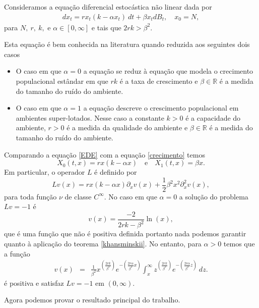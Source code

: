 \documentclass[12pt]{article}
\newcommand{\mr }{ \mathbb{R}}
\begin{document}
Consideramos a equação diferencial estocástica não linear dada por 
\begin{eqnarray}\label{crecimento}
dx_t=rx_t(k-\alpha x_t)~dt+\beta x_tdB_t, \quad x_0=N,
\end{eqnarray}
para $N,~r,~k,$ e $\alpha\in[0,\infty]$ e tais que $2rk>\beta^2$.

Esta equação é bem conhecida na literatura quando reduzida aos seguintes dois casos
\begin{itemize}
\item O caso em que $\alpha=0$ a equação se reduz à equação que modela o crecimento populacional estândar em que $rk$ é a taxa de crescimento e $\beta\in\mr$ é a medida do tamanho do ruído do ambiente.

\item O caso em que $\alpha=1$ a equação descreve o crescimento populacional em ambientes super-lotados. Nesse caso a constante $k>0$ é a capacidade do ambiente, $r>0$ é a medida da qualidade do ambiente  e $\beta\in\mr$ é a medida do tamanho do ruído do ambiente. 


\end{itemize}
Comparando a equação \ref{EDE} com a equação \ref{crecimento} temos 
\[
X_0(t,x)=rx(k-\alpha x)\quad \textrm{e}\quad X_1(t,x)=\beta x.
\]
Em particular, o operador $L$ é definido por 
\[
Lv(x)=rx(k-\alpha x)\partial_xv(x)+\frac{1}{2}\beta^2 x^2\partial_x^2v(x),
\]
para toda função $\nu$ de classe $C^\infty$.
No caso em que $\alpha=0$ a solução do problema $Lv=-1$ é
\[
v(x)=\frac{-2}{2rk-\beta^2} \ln(x),
\]
que é uma função que não é positiva definida portanto nada podemos garantir quanto à aplicação do teorema \ref{khansminskii}. No entanto, para $\alpha>0$ temos que a função 
\begin{eqnarray*}
v(x)&=& \frac{1}{\beta^2}x^{\left(\frac{2rk}{\beta^2}\right)}e^{-\left(\frac{2r\alpha}{\beta^2}x\right)}\int_x^\infty z^{\left(\frac{2rk}{\beta^2}\right)}e^{-\left(\frac{2r\alpha}{\beta^2}z\right)}~dz.
\end{eqnarray*}
é positiva e satisfaz $Lv=-1$ em $(0,\infty)$.
 
 
 Agora podemos provar o resultado principal do trabalho.
\end{document}
